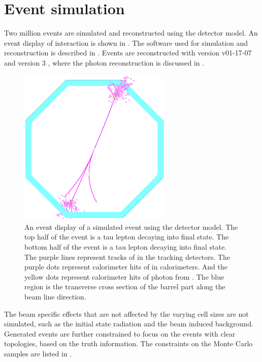 \section{Event simulation}
\label{sec:tauSim}


Two million \eeToTauTau events are simulated and reconstructed using the \ILD detector model. An event display of \eeToTauTau interaction is shown in . The software used for simulation and reconstruction is described in . Events are reconstructed with  \ilcsoft version v01-17-07 \cite{Gaede:82475} and \pandora version 3 \cite{Marshall:2015rfa}, where the photon reconstruction is discussed in .



\begin{figure}[tbph]
\centering
\includegraphics[width=0.65\textwidth]{tau/tau_evt_dsp2}
\caption{ An event display of a simulated \eeToTauTau event using the \ILD detector model. The top half of the event is a tau lepton decaying into \decayRhoFinalState final state. The bottom half of the event is a tau lepton decaying into  \decayThreePionPhoton final state. The purple lines represent tracks of \Ppipm in the tracking detectors. The purple dots represent  calorimeter hits of \Ppipm in calorimeters. And the yellow dots represent calorimeter hits of photon from \HepProcess{\Ppizero \to \Pphoton \Pphoton}. The blue region is the transverse cross section of the \ECAL barrel part along the beam line direction.}
\label{fig:tauEvtDsp}
\end{figure}

The beam specific effects that are not affected by the varying \ECAL cell sizes are not simulated, such as the initial state radiation and the beam induced background. Generated events are further constrained to focus on the events with clear topologies, based on the truth information. The constraints on the Monte Carlo samples are listed in . 


